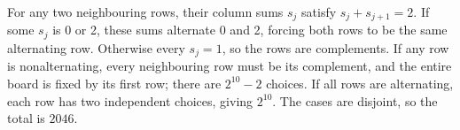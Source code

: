 For any two neighbouring rows, their column sums $s_j$ satisfy $s_j+s_{j+1}=2$. If some $s_j$ is 0 or 2, these sums alternate 0 and 2, forcing both rows to be the same alternating row. Otherwise every $s_j=1$, so the rows are complements. If any row is nonalternating, every neighbouring row must be its complement, and the entire board is fixed by its first row; there are $2^{10}-2$ choices. If all rows are alternating, each row has two independent choices, giving $2^{10}$. The cases are disjoint, so the total is $\boxed{2046}$.

